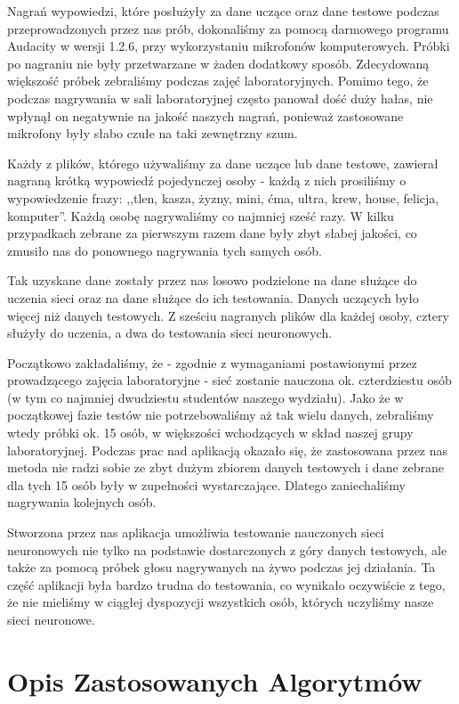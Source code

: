 \documentclass[a4paper]{article}
\begin{document}
Nagrań wypowiedzi, które posłużyły za dane uczące oraz dane testowe podczas przeprowadzonych przez nas prób, dokonaliśmy za pomocą darmowego programu Audacity w wersji 1.2.6, przy wykorzystaniu mikrofonów komputerowych. Próbki po nagraniu nie były przetwarzane w żaden dodatkowy sposób. Zdecydowaną większość próbek zebraliśmy podczas zajęć laboratoryjnych. Pomimo tego, że podczas nagrywania w sali laboratoryjnej często panował dość duży hałas, nie wpłynął on negatywnie na jakość naszych nagrań, ponieważ zastosowane mikrofony były słabo czułe na taki zewnętrzny szum.

Każdy z plików, którego używaliśmy za dane uczące lub dane testowe, zawierał nagraną krótką wypowiedź pojedynczej osoby - każdą z nich prosiliśmy o wypowiedzenie frazy: 
,,tlen, kasza, żyzny, mini, ćma, ultra, krew, house, felicja, komputer''. Każdą osobę nagrywaliśmy co najmniej sześć razy. W kilku przypadkach zebrane za pierwszym razem dane były zbyt słabej jakości, co zmusiło nas do ponownego nagrywania tych samych osób.

Tak uzyskane dane zostały przez nas losowo podzielone na dane służące do uczenia sieci oraz na dane służące do ich testowania. Danych uczących było więcej niż danych testowych. Z sześciu nagranych plików dla każdej osoby, cztery służyły do uczenia, a dwa do testowania sieci neuronowych.

Początkowo zakładaliśmy, że - zgodnie z wymaganiami postawionymi przez prowadzącego zajęcia laboratoryjne - sieć zostanie nauczona ok. czterdziestu osób (w tym co najmniej dwudziestu studentów naszego wydziału). Jako że w początkowej fazie testów nie potrzebowaliśmy aż tak wielu danych, zebraliśmy wtedy próbki ok. 15 osób, w większości wchodzących w skład naszej grupy laboratoryjnej. Podczas prac nad aplikacją okazało się, że zastosowana przez nas metoda nie radzi sobie ze zbyt dużym zbiorem danych testowych i dane zebrane dla tych 15 osób były w zupełności wystarczające. Dlatego zaniechaliśmy nagrywania kolejnych osób.

Stworzona przez nas aplikacja umożliwia testowanie nauczonych sieci neuronowych nie tylko na podstawie dostarczonych z góry danych testowych, ale także za pomocą próbek głosu nagrywanych na żywo podczas jej działania. Ta część aplikacji była bardzo trudna do testowania, co wynikało oczywiście z tego, że nie mieliśmy w ciągłej dyspozycji wszystkich osób, których uczyliśmy nasze sieci neuronowe.

\section{Opis Zastosowanych Algorytmów}
\end{document}
